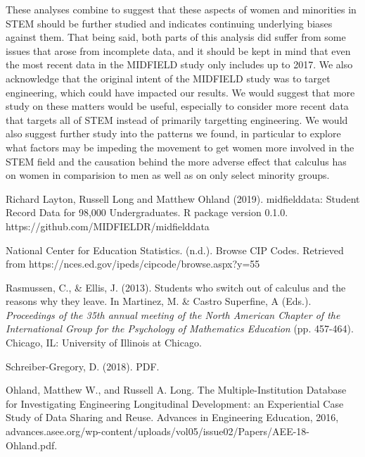 \documentclass[]{article}
\begin{document}
These analyses combine to suggest that these aspects of women and
minorities in STEM should be further studied and indicates continuing
underlying biases against them. That being said, both parts of this
analysis did suffer from some issues that arose from incomplete data,
and it should be kept in mind that even the most recent data in the
MIDFIELD study only includes up to 2017. We also acknowledge that the
original intent of the MIDFIELD study was to target engineering, which
could have impacted our results. We would suggest that more study on
these matters would be useful, especially to consider more recent data
that targets all of STEM instead of primarily targetting engineering. We
would also suggest further study into the patterns we found, in
particular to explore what factors may be impeding the movement to get
women more involved in the STEM field and the causation behind the more
adverse effect that calculus has on women in comparision to men as well
as on only select minority groups.

\newpage

\begin{thebibliography}{9}
Richard Layton, Russell Long and Matthew Ohland
  (2019). midfielddata: Student Record Data for 98,000
  Undergraduates. R package version 0.1.0.
  https://github.com/MIDFIELDR/midfielddata

National Center for Education Statistics. (n.d.).  Browse CIP Codes. Retrieved from https://nces.ed.gov/ipeds/cipcode/browse.aspx?y=55

Rasmussen, C., \& Ellis, J. (2013). Students who switch out of calculus and the reasons why they leave. In Martinez, M. \& Castro Superfine, A (Eds.). \textit{Proceedings of the 35th annual meeting of the North American Chapter of the International Group for the
Psychology of Mathematics Education} (pp. 457-464). Chicago, IL: University of Illinois at Chicago.

Schreiber-Gregory, D. (2018). PDF.

Ohland, Matthew W., and Russell A. Long. The Multiple-Institution Database for Investigating Engineering Longitudinal Development: an Experiential Case Study of Data Sharing and Reuse. Advances in Engineering Education, 2016, advances.asee.org/wp-content/uploads/vol05/issue02/Papers/AEE-18-Ohland.pdf.

\end{thebibliography}

\newpage
\end{document}
